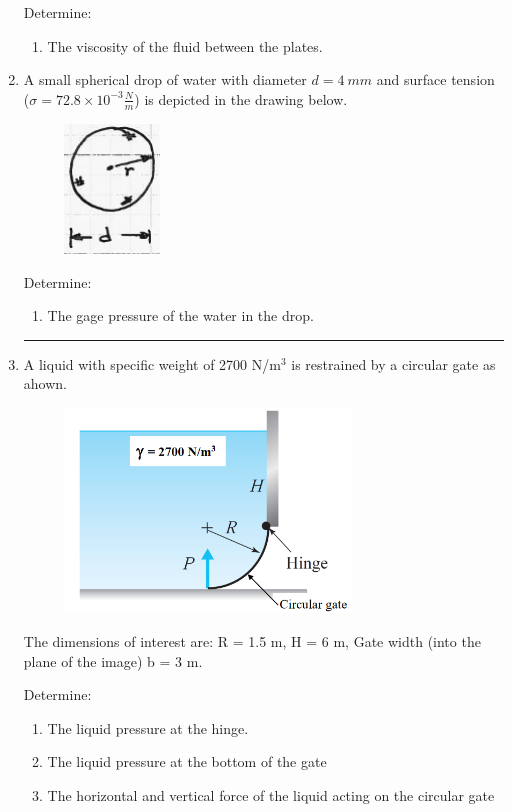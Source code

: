 \documentclass[12pt]{article}
\begin{document}
\begin{enumerate}
Determine:
\begin{enumerate}
\item The viscosity of the fluid between the plates.
\end{enumerate}
\clearpage
\item A small spherical drop of water with diameter $d=4~mm$  and surface tension ($\sigma = 72.8 \times 10^{-3} \frac{N}{m}$) is depicted in the drawing below.

\begin{figure}[h!] %
   \centering
   \includegraphics[width=1in]{drop.png} 
   \caption{}
   \label{fig:drop}
\end{figure}

Determine:
\begin{enumerate}
\item The gage pressure of the water in the drop.
\end{enumerate}
\noindent\rule{\linewidth}{0.4pt}
\item A liquid with specific weight of 2700 N/m$^3$ is restrained by a circular gate as ahown.  


\begin{figure}[h!] %
   \centering
   \includegraphics[width=3in]{circlegate.png} 
   \caption{}
   \label{fig:circlegate}
\end{figure}

The dimensions of interest are: R = 1.5 m, H = 6 m, Gate width (into the plane of the image) b = 3 m.

Determine:
\begin{enumerate}
\item The liquid pressure at the hinge.
\item The liquid pressure at the bottom of the gate
\item The horizontal and vertical force of the liquid acting on the circular gate
\end{enumerate}
\end{enumerate}
\end{document}
